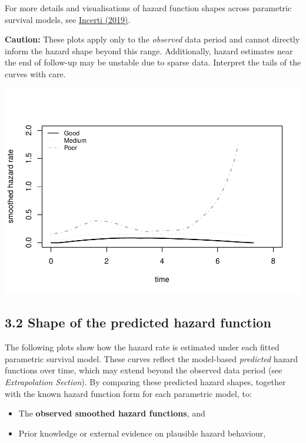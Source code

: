 \documentclass[
]{article}
\providecommand{\tightlist}{%
  \setlength{\itemsep}{0pt}\setlength{\parskip}{0pt}}
\begin{document}
For more details and visualisations of hazard function shapes across
parametric survival models, see
\href{https://devinincerti.com/2019/06/18/parametric_survival.html}{Incerti
(2019)}.

\textbf{Caution:} These plots apply only to the \emph{observed} data
period and cannot directly inform the hazard shape beyond this range.
Additionally, hazard estimates near the end of follow-up may be unstable
due to sparse data. Interpret the tails of the curves with care.

\clearpage

\begin{flushleft}\includegraphics{BC_OS_output/Images/Figure_plot_hr-1} \end{flushleft}

\clearpage

\subsection{3.2 Shape of the predicted hazard
function}\label{shape-of-the-predicted-hazard-function}

The following plots show how the hazard rate is estimated under each
fitted parametric survival model. These curves reflect the model-based
\emph{predicted} hazard functions over time, which may extend beyond the
observed data period (see \emph{Extrapolation Section}). By comparing
these predicted hazard shapes, together with the known hazard function
form for each parametric model, to:

\begin{itemize}
\tightlist
\item
  The \textbf{observed smoothed hazard functions}, and\\
\item
  Prior knowledge or external evidence on plausible hazard behaviour,
\end{itemize}
\end{document}
